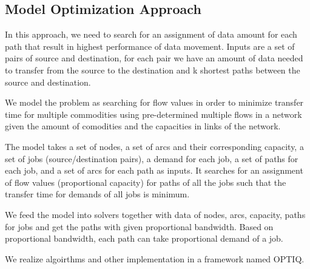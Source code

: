 \subsection{Model Optimization Approach}
\label{sec:optimization}

In this approach, we need to search for an assignment of data amount for each path that result in highest performance of data movement. Inputs are a set of pairs of source and destination, for each pair we have an amount of data needed to transfer from the source to the destination and k shortest paths between the source and destination.

We model the problem as searching for flow values in order to  minimize transfer time for multiple commodities using pre-determined multiple flows in a network given the amount of comodities and the capacities in links of the network. 



The model takes a set of nodes, a set of arcs and their corresponding capacity, a set of jobs (source/destination pairs), a demand for each job, a set of paths for each job, and a set of arcs for each path as inputs. It searches for an assignment of flow values (proportional capacity) for paths of all the jobs such that the transfer time for demands of all jobs is minimum.

We feed the model into solvers together with data of nodes, arcs, capacity, paths for jobs and get the paths with given proportional bandwidth. Based on proportional bandwidth, each path can take proportional demand of a job.

We realize algoirthms and other implementation in a framework named OPTIQ.
